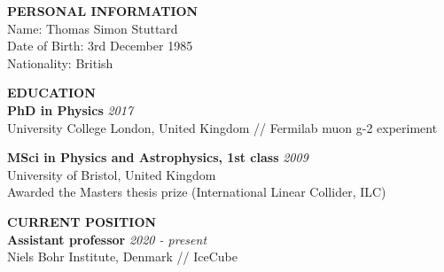 \documentclass[a4paper,11pt]{article}
\renewcommand{\smallskip} {\vspace{0.1in}}
\begin{document}

\vspace{0.2cm}
\textbf{PERSONAL INFORMATION ~~\hrulefill}\smallskip\\
Name: Thomas Simon Stuttard \\
Date of Birth: 3rd December 1985\\
Nationality: British

%
\vspace{0.2cm}
\textbf{EDUCATION ~~\hrulefill}\smallskip\\
%
{\bf PhD in Physics} \hfill {\em 2017} \\ 
University College London, United Kingdom // Fermilab muon g-2 experiment

{\bf MSci in Physics and Astrophysics, 1st class} \hfill {\em 2009} \\ 
University of Bristol, United Kingdom \\
Awarded the Masters thesis prize (International Linear Collider, ILC)

%
%
\vspace{0.2cm}
\textbf{CURRENT POSITION ~~\hrulefill}\smallskip\\
%
{\bf Assistant professor} \hfill {\em 2020 - present} \\ 
Niels Bohr Institute, Denmark // IceCube
\end{document}
